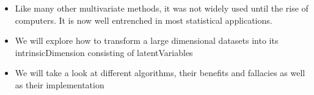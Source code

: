 \begin{itemize}
	\item Like many other multivariate methods, it was not widely used until the rise of computers. 
	It is now well entrenched in most statistical applications. \cite{Jolliffe2002book}
	\item We will explore how to transform a large dimensional datasets into its \gls{intrinsicDimension} consisting of \glspl{latentVariable}
	\item We will take a look at different algorithms, their benefits and fallacies as well as their implementation
\end{itemize}

